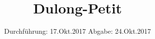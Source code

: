 

\subject{V201}
\title{Dulong-Petit}
\date{%
  Durchführung: 17.Okt.2017
  \hspace{3em}
  Abgabe: 24.Okt.2017
}



\maketitle
\thispagestyle{empty}
\tableofcontents
\newpage






\printbibliography{}


